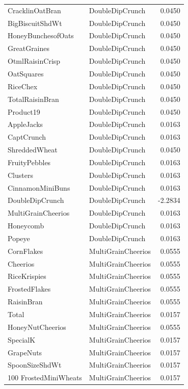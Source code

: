 \begin{longtable}{llr}
CracklinOatBran & DoubleDipCrunch & 0.0450 \\
BigBiscuitShdWt & DoubleDipCrunch & 0.0450 \\
HoneyBunchesofOats & DoubleDipCrunch & 0.0450 \\
GreatGraines & DoubleDipCrunch & 0.0450 \\
OtmlRaisinCrisp & DoubleDipCrunch & 0.0450 \\
OatSquares & DoubleDipCrunch & 0.0450 \\
RiceChex & DoubleDipCrunch & 0.0450 \\
TotalRaisinBran & DoubleDipCrunch & 0.0450 \\
Product19 & DoubleDipCrunch & 0.0450 \\
AppleJacks & DoubleDipCrunch & 0.0163 \\
CaptCrunch & DoubleDipCrunch & 0.0163 \\
ShreddedWheat & DoubleDipCrunch & 0.0450 \\
FruityPebbles & DoubleDipCrunch & 0.0163 \\
Clusters & DoubleDipCrunch & 0.0163 \\
CinnamonMiniBuns & DoubleDipCrunch & 0.0163 \\
DoubleDipCrunch & DoubleDipCrunch & -2.2834 \\
MultiGrainCheerios & DoubleDipCrunch & 0.0163 \\
Honeycomb & DoubleDipCrunch & 0.0163 \\
Popeye & DoubleDipCrunch & 0.0163 \\
CornFlakes & MultiGrainCheerios & 0.0555 \\
Cheerios & MultiGrainCheerios & 0.0555 \\
RiceKrispies & MultiGrainCheerios & 0.0555 \\
FrostedFlakes & MultiGrainCheerios & 0.0555 \\
RaisinBran & MultiGrainCheerios & 0.0555 \\
Total & MultiGrainCheerios & 0.0157 \\
HoneyNutCheerios & MultiGrainCheerios & 0.0555 \\
SpecialK & MultiGrainCheerios & 0.0157 \\
GrapeNuts & MultiGrainCheerios & 0.0157 \\
SpoonSizeShdWt & MultiGrainCheerios & 0.0157 \\
100%
FrostedMiniWheats & MultiGrainCheerios & 0.0157 \\

\end{longtable}

